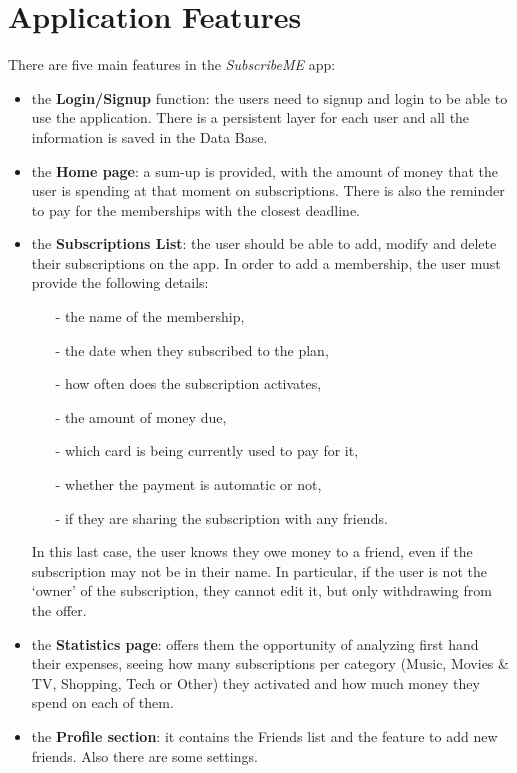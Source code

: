 \documentclass[12pt]{article}
\begin{document}
\section{Application Features}\label{sec:features}
There are five main features in the \textit{SubscribeME} app:
\begin{itemize}
    \item the \textbf{Login/Signup} function: the users need to signup and login to be able to use the application. There is a persistent layer for each user and all the information is saved in the Data Base.
    \item the \textbf{Home page}: a sum-up is provided, with the amount of money that the user is spending at that moment on subscriptions. There is also the reminder to pay for the memberships with the closest deadline.
    \item the \textbf{Subscriptions List}: the user should be able to add, modify and delete their subscriptions on the app.
          In order to add a membership, the user must provide the following details:
          \begin{itemize}
              \item[-] the name of the membership,
              \item[-] the date when they subscribed to the plan,
              \item[-] how often does the subscription activates,
              \item[-] the amount of money due,
              \item[-] which card is being currently used to pay for it,
              \item[-] whether the payment is automatic or not,
              \item[-] if they are sharing the subscription with any friends.
          \end{itemize}
          In this last case, the user knows they owe money to a friend, even if the subscription may not be in their name. In particular, if the user is not the `owner' of the subscription, they cannot edit it, but only withdrawing from the offer.
    \item the \textbf{Statistics page}: offers them the opportunity of analyzing first hand their expenses, seeing how many subscriptions per category (Music, Movies \& TV, Shopping, Tech or Other) they activated and how much money they spend on each of them.
    \item the \textbf{Profile section}: it contains the Friends list and the feature to add new friends. Also there are some settings.
\end{itemize}
\end{document}
